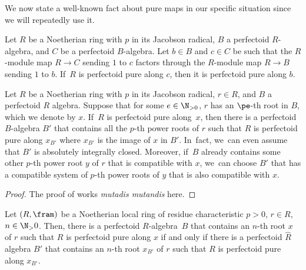 We now state a well-known fact about pure maps in our specific situation since we will repeatedly use it.

\begin{lemma}\label{pfd pure with smaller root}
Let $R$ be a Noetherian ring with $p$ in its Jacobson radical, $B$ a perfectoid $R$\nobreakdash-algebra, and $C$ be a perfectoid $B$-algebra. Let $b\in B$ and $c\in C$ be such that the $R$\nobreakdash-module map $R\to C$ sending $1$ to $c$ factors through the $R$\nobreakdash-module map $R\to B$ sending $1$ to $b$. If~$R$ is perfectoid pure along $c$, then it is perfectoid pure along $b$.
\end{lemma}

\begin{proposition}\label{pfd pure can be with alg closed alg}
Let $R$ be a Noetherian ring with $p$ in its Jacobson radical, $r\in R$, and $B$ a perfectoid $R$ algebra. Suppose that for some $e\in \N_{>0}$, $r$ has an $\pe$-th root in $B$, which we denote by $x$. If~$R$ is perfectoid pure along~$x$, then there is a perfectoid $B$-algebra $B'$ that contains all the $p$-th power roots of $r$ such that $R$ is perfectoid pure along $x_{B'}$ where $x_{B'}$ is the image of $x$ in $B'$. In~fact, we~can even assume that $B'$ is absolutely integrally closed. Moreover, if~$B$ already contains some other $p$-th power root $y$ of $r$ that is compatible with $x$, we~can choose $B'$ that has a compatible system of $p$-th power roots of $y$ that is also compatible with $x$.
\end{proposition}

\begin{proof}
The proof of \cite[Lem.\,4.5]{BMPSTWWPerfectoidPure} works \emph{mutadis mutandis} here.
\end{proof}

\begin{proposition}\label{pfd pure iff completion pfd pure}
Let $(R,\fram)$ be a Noetherian local ring of residue characteristic $p>0$, $r\in R$, $n\in \N_>0$. Then, there is a perfectoid $R$\nobreakdash-algebra~$B$ that contains an $n$-th root $x$ of $r$ such that $R$ is perfectoid pure along $x$ if and only if there is a perfectoid $\widehat{R}$ algebra $B'$ that contains an $n$-th root $x_{B'}$ of $r$ such that $R$ is perfectoid pure along $x_{B'}$.
\end{proposition}

